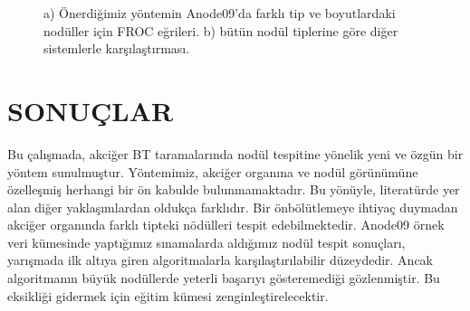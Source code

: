 \documentclass[conference]{IEEEtran}
\begin{document}
\begin{figure}[tb]
\centering
{}
\caption{a) Önerdiğimiz yöntemin Anode09'da farklı tip ve boyutlardaki nodüller için FROC eğrileri. b) bütün nodül tiplerine göre diğer sistemlerle karşılaştırması.}
\end{figure}

\section{SONUÇLAR}
Bu çalışmada, akciğer BT taramalarında nodül tespitine yönelik yeni ve özgün bir yöntem sunulmuştur. Yöntemimiz, akciğer organına ve nodül görünümüne özelleşmiş herhangi bir ön kabulde bulunmamaktadır. Bu yönüyle, literatürde yer alan diğer yaklaşımlardan oldukça farklıdır. Bir önbölütlemeye ihtiyaç duymadan akciğer organında farklı tipteki nödülleri tespit edebilmektedir. Anode09 örnek veri kümesinde yaptığımız sınamalarda aldığımız nodül tespit sonuçları, yarışmada ilk altıya giren algoritmalarla karşılaştırılabilir düzeydedir. Ancak algoritmanın büyük nodüllerde yeterli başarıyı gösteremediği gözlenmiştir. Bu eksikliği gidermek için eğitim kümesi zenginleştirelecektir. 
\end{document}
